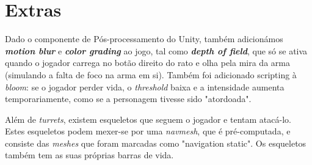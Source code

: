 \documentclass{article}
\begin{document}
    \section*{Extras}
        \par
        Dado o componente de Pós-processamento do Unity, também adicionámos \textbf{\textit{motion blur}} e \textbf{\textit{color grading}} ao jogo, tal como \textbf{\textit{depth of field}}, que só se ativa quando o jogador carrega no botão direito do rato e olha pela mira da arma (simulando a falta de foco na arma em si). Também foi adicionado scripting à \textit{bloom}: se o jogador perder vida, o \textit{threshold} baixa e a intensidade aumenta temporariamente, como se a personagem tivesse sido "atordoada".
        \par
        Além de \textit{turrets}, existem esqueletos que seguem o jogador e tentam atacá-lo. Estes esqueletos podem mexer-se por uma \textit{navmesh}, que é pré-computada, e consiste das \textit{meshes} que foram marcadas como "navigation static". Os esqueletos também tem as suas próprias barras de vida.
\end{document}

